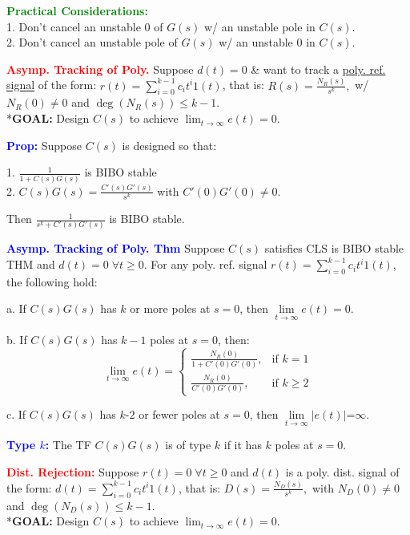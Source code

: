\documentclass[5pt]{extarticle} %
\begin{document}
\begin{paracol}{3}
{    \textcolor{green}{\textbf{Practical Considerations:}} \\
    1. Don't cancel an unstable 0 of $G(s)$ w/ an unstable pole in $C(s)$. \\
    2. Don't cancel an unstable pole of $G(s)$ w/ an unstable 0 in $C(s)$. 

    \textcolor{red}{\textbf{Asymp. Tracking of Poly.}} Suppose $d(t) = 0$ \& want to track a \underline{poly. ref. signal} of the form:  
    $r(t) = \sum_{i=0}^{k-1} c_i t^i 1(t)$, that is: $R(s) = \frac{N_R(s)}{s^k},$ w/ $N_R(0) \neq 0$ and $\deg(N_R(s)) \leq k-1.$  \\
    *\textbf{GOAL:} Design $C(s)$ to achieve $\lim_{t \to \infty} e(t) = 0.$ 

    \textcolor{blue}{\textbf{Prop:}} Suppose $C(s)$ is designed so that:

    1. $\frac{1}{1 + C(s) G(s)}$ is BIBO stable \\
    2. $C(s) G(s) = \frac{C'(s) G'(s)}{s^k}$ with $C'(0) G'(0) \neq 0$.

    Then $\frac{1}{s^k + C'(s) G'(s)}$ is BIBO stable.

    \textcolor{blue}{\textbf{Asymp. Tracking of Poly. Thm}} Suppose $C(s)$ satisfies CLS is BIBO stable THM and $d(t) = 0 \; \forall t \geq 0$. For any poly. ref. signal $r(t) = \sum_{i=0}^{k-1} c_i t^i 1(t)$, the following hold:

    a. If $C(s) G(s)$ has $k$ or more poles at $s = 0$, then $\lim\limits_{t \to \infty} e(t) = 0$.

    b. If $C(s) G(s)$ has $k-1$ poles at $s = 0$, then:
    \[ \lim\limits_{t \to \infty} e(t) = \begin{cases} \frac{N_R(0)}{1 + C'(0) G'(0)}, & \text{if } k = 1 \\ \frac{N_R(0)}{C'(0) G'(0)}, & \text{if } k \geq 2 \end{cases} \]

    c. If $C(s) G(s)$ has $k\text{-}2$ or fewer poles at $s = 0$, then $\lim\limits_{t \to \infty} |e(t)| \text{=} \infty$.

    \textcolor{blue}{\textbf{Type $k$:}} The TF $C(s) G(s)$ is of type $k$ if it has $k$ poles at $s = 0$.

    \textcolor{red}{\textbf{Dist. Rejection:}} Suppose $r(t) = 0 \; \forall t \geq 0$ and $d(t)$ is a poly. dist. signal of the form:
    $d(t) = \sum_{i=0}^{k-1} c_i t^i 1(t)$,
    that is:
    $D(s) = \frac{N_D(s)}{s^k},$ with $N_D(0) \neq 0$ and $\deg(N_D(s)) \leq k-1.$ \\
    *\textbf{GOAL:} Design $C(s)$ to achieve $\lim_{t \to \infty} e(t) = 0.$

}
\end{paracol}
\end{document}
